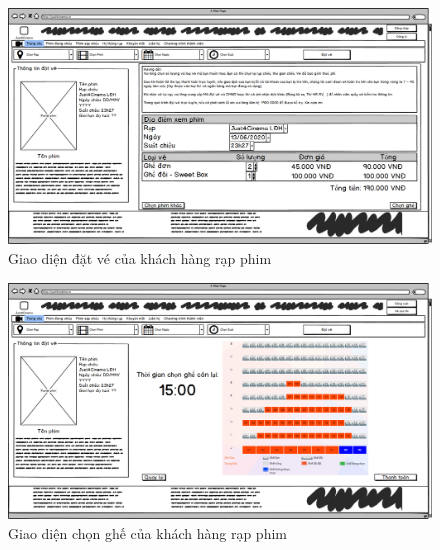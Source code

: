 \documentclass[a4paper, 12pt]{article}
\begin{document}
\begin{enumerate}
        \begin{figure}[H]
            \begin{center}
                \includegraphics[scale = 0.25]{Wireframe/User/Đặt vé.png}
                \caption{Giao diện đặt vé của khách hàng rạp phim}
            \end{center}
        \end{figure}

        \begin{figure}[H]
            \begin{center}
                \includegraphics[scale = 0.25]{Wireframe/User/Chọn ghế.png}
                \caption{Giao diện chọn ghế của khách hàng rạp phim}
            \end{center}
        \end{figure}


\end{enumerate}
\end{document}
